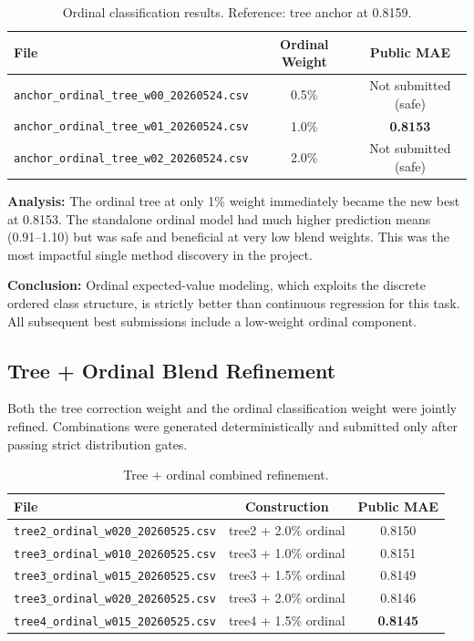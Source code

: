 \documentclass[12pt, a4paper]{article}
\begin{document}
\begin{table}[H]
\centering
\caption{Ordinal classification results. Reference: tree anchor at 0.8159.}
\label{tab:ordinal}
\begin{tabular}{@{}lcc@{}}
\toprule
\textbf{File} & \textbf{Ordinal Weight} & \textbf{Public MAE} \\
\midrule
\texttt{anchor\_ordinal\_tree\_w00\_20260524.csv} & 0.5\% & Not submitted (safe) \\
\texttt{anchor\_ordinal\_tree\_w01\_20260524.csv} & 1.0\% & \textbf{0.8153} \\
\texttt{anchor\_ordinal\_tree\_w02\_20260524.csv} & 2.0\% & Not submitted (safe) \\
\bottomrule
\end{tabular}
\end{table}

\textbf{Analysis:} The ordinal tree at only 1\% weight immediately became the new best at 0.8153. The standalone ordinal model had much higher prediction means (0.91--1.10) but was safe and beneficial at very low blend weights. This was the most impactful single method discovery in the project.

\textbf{Conclusion:} Ordinal expected-value modeling, which exploits the discrete ordered class structure, is strictly better than continuous regression for this task. All subsequent best submissions include a low-weight ordinal component.

\subsection{Tree + Ordinal Blend Refinement}
Both the tree correction weight and the ordinal classification weight were jointly refined. Combinations were generated deterministically and submitted only after passing strict distribution gates.

\begin{table}[H]
\centering
\caption{Tree + ordinal combined refinement.}
\label{tab:combo}
\begin{tabular}{@{}lcc@{}}
\toprule
\textbf{File} & \textbf{Construction} & \textbf{Public MAE} \\
\midrule
\texttt{tree2\_ordinal\_w020\_20260525.csv}  & tree2 + 2.0\% ordinal & 0.8150 \\
\texttt{tree3\_ordinal\_w010\_20260525.csv}  & tree3 + 1.0\% ordinal & 0.8151 \\
\texttt{tree3\_ordinal\_w015\_20260525.csv}  & tree3 + 1.5\% ordinal & 0.8149 \\
\texttt{tree3\_ordinal\_w020\_20260525.csv}  & tree3 + 2.0\% ordinal & 0.8146 \\
\texttt{tree4\_ordinal\_w015\_20260525.csv}  & tree4 + 1.5\% ordinal & \textbf{0.8145} \\
\bottomrule
\end{tabular}
\end{table}
\end{document}
